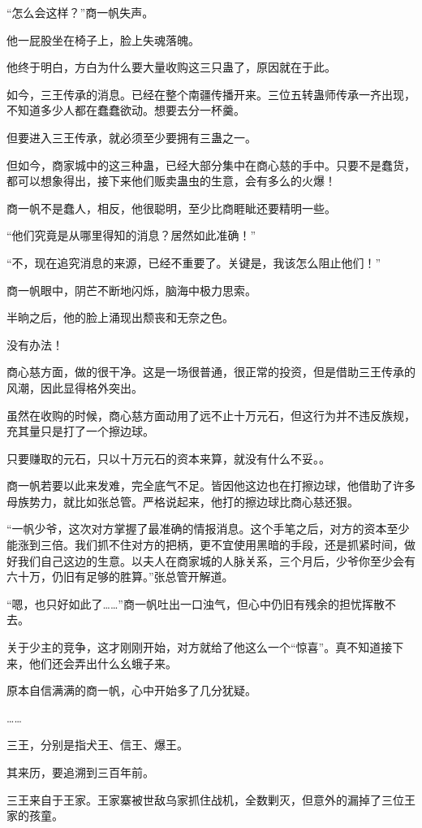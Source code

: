 \begin{this_body}
“怎么会这样？”商一帆失声。

他一屁股坐在椅子上，脸上失魂落魄。

他终于明白，方白为什么要大量收购这三只蛊了，原因就在于此。

如今，三王传承的消息。已经在整个南疆传播开来。三位五转蛊师传承一齐出现，不知道多少人都在蠢蠢欲动。想要去分一杯羹。

但要进入三王传承，就必须至少要拥有三蛊之一。

但如今，商家城中的这三种蛊，已经大部分集中在商心慈的手中。只要不是蠢货，都可以想象得出，接下来他们贩卖蛊虫的生意，会有多么的火爆！

商一帆不是蠢人，相反，他很聪明，至少比商睚眦还要精明一些。

“他们究竟是从哪里得知的消息？居然如此准确！”

“不，现在追究消息的来源，已经不重要了。关键是，我该怎么阻止他们！”

商一帆眼中，阴芒不断地闪烁，脑海中极力思索。

半晌之后，他的脸上涌现出颓丧和无奈之色。

没有办法！

商心慈方面，做的很干净。这是一场很普通，很正常的投资，但是借助三王传承的风潮，因此显得格外突出。

虽然在收购的时候，商心慈方面动用了远不止十万元石，但这行为并不违反族规，充其量只是打了一个擦边球。

只要赚取的元石，只以十万元石的资本来算，就没有什么不妥。。

商一帆若要以此来发难，完全底气不足。皆因他这边也在打擦边球，他借助了许多母族势力，就比如张总管。严格说起来，他打的擦边球比商心慈还狠。

“一帆少爷，这次对方掌握了最准确的情报消息。这个手笔之后，对方的资本至少能涨到三倍。我们抓不住对方的把柄，更不宜使用黑暗的手段，还是抓紧时间，做好我们自己这边的生意。以夫人在商家城的人脉关系，三个月后，少爷你至少会有六十万，仍旧有足够的胜算。”张总管开解道。

“嗯，也只好如此了……”商一帆吐出一口浊气，但心中仍旧有残余的担忧挥散不去。

关于少主的竞争，这才刚刚开始，对方就给了他这么一个“惊喜”。真不知道接下来，他们还会弄出什么幺蛾子来。

原本自信满满的商一帆，心中开始多了几分犹疑。

……

三王，分别是指犬王、信王、爆王。

其来历，要追溯到三百年前。

三王来自于王家。王家寨被世敌乌家抓住战机，全数剿灭，但意外的漏掉了三位王家的孩童。


\end{this_body}

